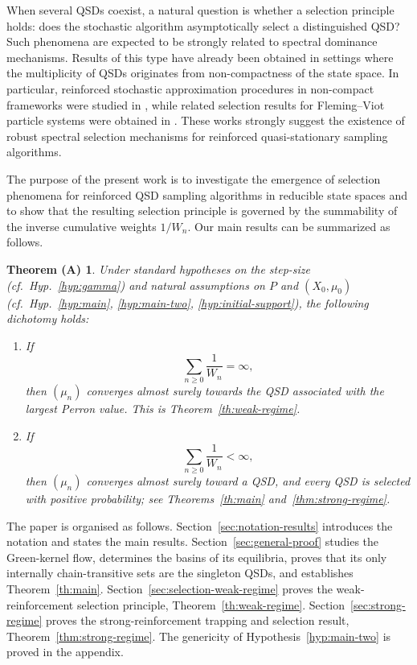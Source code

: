 \documentclass[10pt,letterpaper]{article}
\theoremstyle{compactplain}
\theoremstyle{compactdefinition}
\newcommand{\1}{\mathds{1}}
\newtheorem*{theoremA}{Theorem (A)}
\begin{document}
\medskip{}

When several QSDs coexist, a natural question is whether a selection principle holds: does the stochastic algorithm asymptotically select a distinguished QSD? Such phenomena are expected to be strongly related to spectral dominance mechanisms. Results of this type have already been obtained in settings where the multiplicity of QSDs originates from non-compactness of the state space. In particular, reinforced stochastic approximation procedures in non-compact frameworks were studied in \cite{MaillerVillemonais2020}, while related selection results for Fleming--Viot particle systems were obtained in \cite{tough2025selection}. These works strongly suggest the existence of robust spectral selection mechanisms for reinforced quasi-stationary sampling algorithms.

\medskip{}

The purpose of the present work is to investigate the emergence of selection
phenomena for reinforced QSD sampling algorithms in reducible state spaces and
to show that the resulting selection principle is governed by the summability
of the inverse cumulative weights \(1/W_n\). Our main results can be summarized
as follows.

\begin{theoremA}
Under standard hypotheses on the step-size (cf.~Hyp.~\ref{hyp:gamma}) and natural assumptions on $P$ and $(X_0, \mu_0)$ (cf.~Hyp.~\ref{hyp:main}, \ref{hyp:main-two}, \ref{hyp:initial-support}), the following dichotomy holds: 
\begin{enumerate}
    \item[\textup{(i)}]
    If
    \[
    \sum_{n\geq0}\frac{1}{W_n}=\infty,
  \]
    then $(\mu_n)$ converges almost surely towards the QSD associated with the largest Perron value.
    This is Theorem~\ref{th:weak-regime}.

    \item[\textup{(ii)}]
    If
    \[ \sum_{n\geq0}\frac{1}{W_n}<\infty,\]
  then $(\mu_n)$ converges almost surely toward a QSD, and every QSD is selected with positive probability; see Theorems~\ref{th:main} and~\ref{thm:strong-regime}.
\end{enumerate}




\end{theoremA}

The paper is organised as follows.
Section~\ref{sec:notation-results} introduces the notation and states the main results. Section~\ref{sec:general-proof} studies the Green-kernel flow, determines the basins of its equilibria, proves that its only internally
chain-transitive sets are the singleton QSDs, and establishes
Theorem~\ref{th:main}. Section~\ref{sec:selection-weak-regime} proves the weak-reinforcement selection principle, Theorem~\ref{th:weak-regime}.
Section~\ref{sec:strong-regime} proves the strong-reinforcement trapping and selection result, Theorem~\ref{thm:strong-regime}. The genericity of
Hypothesis~\ref{hyp:main-two} is proved in the appendix.
\end{document}
